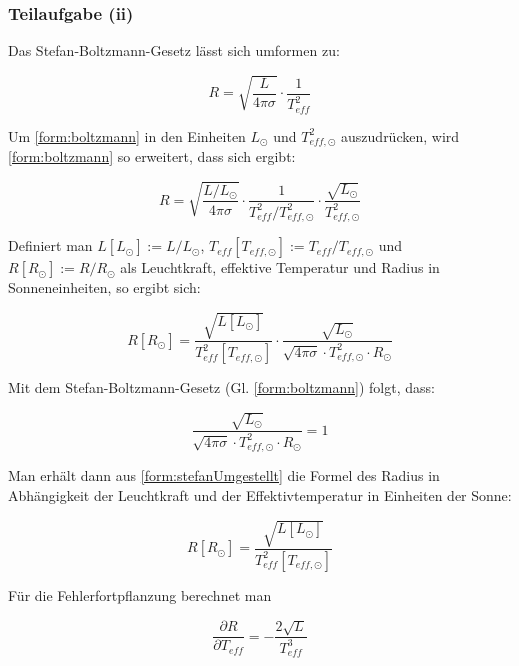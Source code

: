 \documentclass[titlepage]{scrartcl}
\begin{document}
\subsubsection{Teilaufgabe (ii)}
Das Stefan-Boltzmann-Gesetz lässt sich umformen zu:

\begin{equation}
R = \sqrt{\frac{L}{4 \pi \sigma}} \cdot \frac{1}{T_{eff}^2}
\label{form:boltzmann}
\end{equation}

Um \eqref{form:boltzmann} in den Einheiten $ L_{\odot} $ und $ T^2_{eff,\odot} $ auszudrücken, wird \eqref{form:boltzmann} so erweitert, dass sich ergibt:

\begin{equation}
R = \sqrt{\frac{L/L_{\odot}}{4 \pi \sigma}} \cdot \frac{1}{T^2_{eff}/T^2_{eff,\odot}} \cdot \frac{\sqrt{L_{\odot}}}{T^2_{eff,\odot}}
\end{equation}

Definiert man $ L[L_{\odot}] := L/L_{\odot} $, $ T_{eff}[T_{eff,\odot}] := T_{eff}/T_{eff,\odot} $ und $ R[R_{\odot}] := R/R_{\odot} $ als Leuchtkraft, effektive Temperatur und Radius in Sonneneinheiten, so ergibt sich:

\begin{equation}
R[R_{\odot}] = \frac{\sqrt{L[L_{\odot}]}}{T^2_{eff}[T_{eff,\odot}]} \cdot \frac{\sqrt{L_{\odot}}}{\sqrt{4 \pi \sigma} \cdot T^2_{eff,\odot} \cdot R_{\odot}}
\label{form:stefanUmgestellt}
\end{equation}

Mit dem Stefan-Boltzmann-Gesetz (Gl. \ref{form:boltzmann}) folgt, dass:

\begin{equation}
\frac{\sqrt{L_{\odot}}}{\sqrt{4 \pi \sigma} \cdot T^2_{eff,\odot} \cdot R_{\odot}} = 1
\end{equation}

Man erhält dann aus \eqref{form:stefanUmgestellt} die Formel des Radius in Abhängigkeit der Leuchtkraft und der Effektivtemperatur in Einheiten der Sonne:

\begin{equation}
R[R_{\odot}] = \frac{\sqrt{L[L_{\odot}]}}{T^2_{eff}[T_{eff,\odot}]}
\end{equation}

\newpage

Für die Fehlerfortpflanzung berechnet man

\begin{equation}
\frac{\partial R}{\partial T_{eff}} = - \frac{2 \sqrt{L}}{T^3_{eff}}
\label{form:fehlerfortStefan1}
\end{equation}
\end{document}
